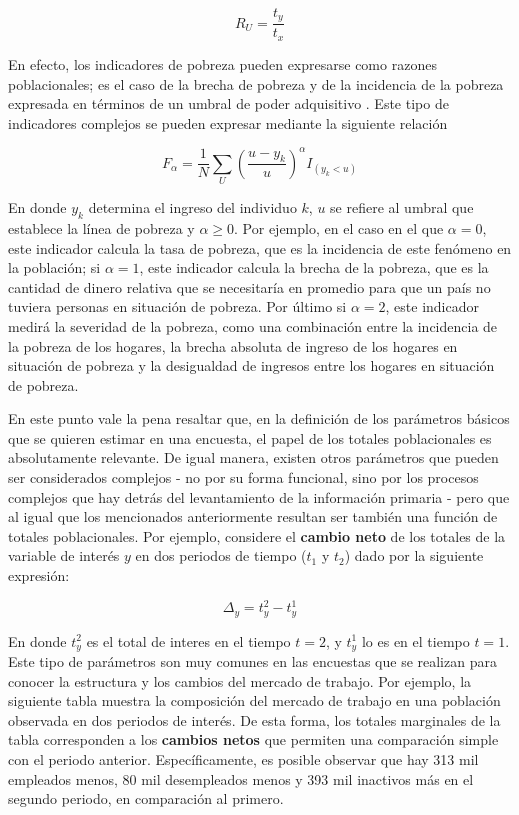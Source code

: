 \documentclass[
  12pt,
  spanish,
]{book}
\begin{document}
\[R_U=\frac{t_y}{t_x}\]

En efecto, los indicadores de pobreza pueden expresarse como razones poblacionales; es el caso de la brecha de pobreza y de la incidencia de la pobreza expresada en términos de un umbral de poder adquisitivo \citep{Foster_Greer_Thorbecke_1984}. Este tipo de indicadores complejos se pueden expresar mediante la siguiente relación

\[
F_{\alpha} = \frac{1}{N} \sum_U \left(\frac{u-y_k}{u}\right)^{\alpha}I_{(y_k < u)}
\]

En donde \(y_k\) determina el ingreso del individuo \(k\), \(u\) se refiere al umbral que establece la línea de pobreza y \(\alpha \geq 0\). Por ejemplo, en el caso en el que \(\alpha = 0\), este indicador calcula la tasa de pobreza, que es la incidencia de este fenómeno en la población; si \(\alpha = 1\), este indicador calcula la brecha de la pobreza, que es la cantidad de dinero relativa que se necesitaría en promedio para que un país no tuviera personas en situación de pobreza. Por último si \(\alpha = 2\), este indicador medirá la severidad de la pobreza, como una combinación entre la incidencia de la pobreza de los hogares, la brecha absoluta de ingreso de los hogares en situación de pobreza y la desigualdad de ingresos entre los hogares en situación de pobreza.

En este punto vale la pena resaltar que, en la definición de los parámetros básicos que se quieren estimar en una encuesta, el papel de los totales poblacionales es absolutamente relevante. De igual manera, existen otros parámetros que pueden ser considerados complejos - no por su forma funcional, sino por los procesos complejos que hay detrás del levantamiento de la información primaria - pero que al igual que los mencionados anteriormente resultan ser también una función de totales poblacionales. Por ejemplo, considere el \textbf{cambio neto} de los totales de la variable de interés \(y\) en dos periodos de tiempo (\(t_1\) y \(t_2\)) dado por la siguiente expresión:

\[
\Delta_y = t_{y}^2 - t_{y}^1
\]

En donde \(t_{y}^2\) es el total de interes en el tiempo \(t = 2\), y \(t_{y}^1\) lo es en el tiempo \(t=1\). Este tipo de parámetros son muy comunes en las encuestas que se realizan para conocer la estructura y los cambios del mercado de trabajo. Por ejemplo, la siguiente tabla muestra la composición del mercado de trabajo en una población observada en dos periodos de interés. De esta forma, los totales marginales de la tabla corresponden a los \textbf{cambios netos} que permiten una comparación simple con el periodo anterior. Específicamente, es posible observar que hay 313 mil empleados menos, 80 mil desempleados menos y 393 mil inactivos más en el segundo periodo, en comparación al primero.
\end{document}
